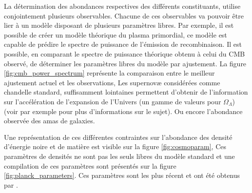 La détermination des abondances respectives des différents constituants, utilise conjointement plusieurs observables.
Chacune de ces observables va pouvoir être lier à un modèle disposant de plusieurs paramètres libres.
Par exemple, il est possible de créer un modèle théorique du plasma primordial, ce modèle est capable de prédire le spectre de puissance de l'émission de recombinaison.
Il est possible, en comparant le spectre de puissance théorique obtenu à celui du \ac{CMB} observé, de déterminer les paramètres libres du modèle par ajustement.
La figure \ref{fig:cmb_power_spectrum} représente la comparaison entre le meilleur ajustement actuel et les observations, 
Les supernovæ considérées comme chandelle standard, suffisamment lointaines permettent d'obtenir de l'information sur l'accélération de l'expansion de l'Univers (un gamme de valeurs pour $\Omega_\Lambda$) (voir par exemple \cite{1999ApJ...517..565P} pour plus d'informations sur le sujet).
Ou encore l'abondance observée des amas de galaxies.



Une représentation de ces différentes contraintes sur l'abondance des densité d'énergie noire et de matière est visible sur la figure \ref{fig:cosmoparam},
Ces paramètres de densités ne sont pas les seuls libres du modèle standard et une compilation de ces paramètres sont présentés sur la figure \ref{fig:planck_parameters}.
Ces paramètres sont les plus récent et ont été obtenus par \cite{planck_collaboration_planck_2016}.



